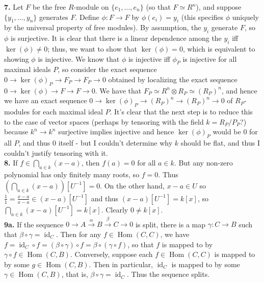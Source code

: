 \documentclass[11pt]{article}
\newcommand{\num}[1]{\noindent \textbf{#1}}
\newcommand{\id}{\operatorname{id}}
\newcommand{\Hom}{\operatorname{Hom}}
\theoremstyle{definition}
\begin{document}
\num{7.} Let $F$ be the free $R$-module on $\{e_1,\ldots,e_n\}$ (so that $F\simeq R^n$), and suppose $\{y_1,\ldots,y_n\}$ generates $F$. Define $\phi:F\rightarrow F$ by $\phi(e_i)=y_i$ (this specifies $\phi$ uniquely by the universal property of free modules). By assumption, the $y_i$ generate $F$, so $\phi$ is surjective. It is clear that there is a linear dependence among the $y_i$ iff $\ker(\phi)\neq0$; thus, we want to show that $\ker(\phi)=0$, which is equivalent to showing $\phi$ is injective. We know that $\phi$ is injective iff $\phi_P$ is injective for all maximal ideals $P$, so consider the exact sequence $0\rightarrow \ker(\phi)_P\rightarrow F_P\rightarrow F_P\rightarrow 0$ obtained by localizing the exact sequence $0\rightarrow\ker(\phi)\rightarrow F\rightarrow F\rightarrow0$. We have that $F_P\simeq R^n\otimes R_P\simeq(R_P)^n$, and hence we have an exact sequence $0\rightarrow\ker(\phi)_P\rightarrow (R_P)^n\rightarrow (R_P)^n\rightarrow 0$ of $R_P$-modules for each maximal ideal $P$. It's clear that the next step is to reduce this to the case of vector spaces (perhaps by tensoring with the field $k=R_P/P_P$?) because $k^n\rightarrow k^n$ surjective implies injective and hence $\ker(\phi)_P$ would be 0 for all $P$, and thus 0 itself - but I couldn't determine why $k$ should be flat, and thus I couldn't justify tensoring with it. \\

\num{8.} If $f\in\bigcap_{a\in k}(x-a)$, then $f(a)=0$ for all $a\in k$. But any non-zero polynomial has only finitely many roots, so $f=0$. Thus $(\bigcap_{a\in k}(x-a))[U^{-1}]=0$. On the other hand, $x-a\in U$ so $\frac{1}{1}=\frac{x-a}{x-a}\in(x-a)[U^{-1}]$ and thus $(x-a)[U^{-1}]=k[x]$, so $\bigcap_{a\in k}(x-a)[U^{-1}]=k[x]$. Clearly $0\neq k[x]$.     \\

\num{9a.} If the sequence $0\rightarrow A\stackrel{\alpha}{\rightarrow}B\stackrel{\beta}{\rightarrow}C\rightarrow0$ is split, there is a map $\gamma:C\rightarrow B$ such that $\beta\circ\gamma=\id_C$. Then for any $f\in\Hom(C,C)$, we have $f=\id_C\circ f=(\beta\circ\gamma)\circ f=\beta\circ(\gamma\circ f)$, so that $f$ is mapped to by $\gamma\circ f\in\Hom(C,B)$. Conversely, suppose each $f\in\Hom(C,C)$ is mapped to by some $g\in\Hom(C,B)$. Then in particular, $\id_C$ is mapped to by some $\gamma\in\Hom(C,B)$, that is, $\beta\circ \gamma=\id_C$. Thus the sequence splits.    \\
\end{document}
